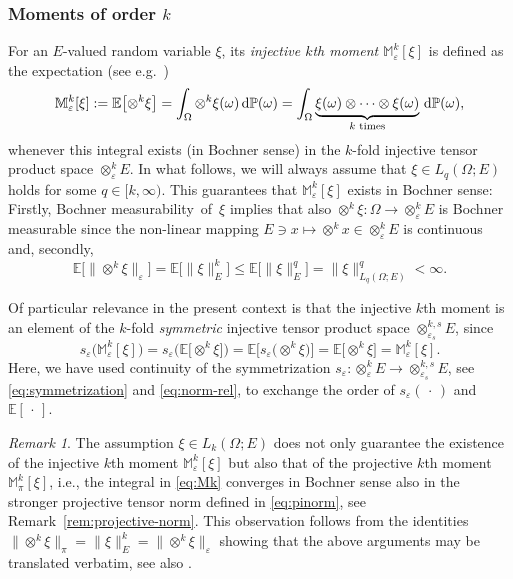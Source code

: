 \documentclass[reqno]{amsart}
\numberwithin{equation}{section}
\newcommand{\bbE}{\mathbb{E}}
\newcommand{\bbM}{\mathbb{M}}
\newcommand{\bbP}{\mathbb{P}}
\newcommand{\xk}{\otimes^k}
\newcommand{\xkeps}{\otimes^k_\varepsilon}
\newcommand{\xkseps}{\otimes^{k,s}_{\varepsilon_s}}
\newcommand{\Mk}{\bbM^k_\varepsilon}
\newcommand{\Mkpi}{\bbM^k_\pi}
\newcommand{\norm}[2]{     \| #1       \|_{ #2 }}
\newcommand{\rd}{\mathrm{d}}
\newcommand{\from}{\colon}
\newcommand{\eps}{\varepsilon}
\newcommand{\sym}{s}
\theoremstyle{remark}
\newtheorem{remark}[lemma]{Remark}
\theoremstyle{definition}
\begin{document}
\subsubsection{Moments of order $k$}

For an $E$-valued random variable $\xi$, 
its \emph{injective $k$th moment $\Mk[\xi]$} is defined as 
the expectation 
(see e.g.~\cite[Section~3.1]{JansonKaijser2015})
%
\begin{equation}\label{eq:Mk} 
\Mk[\xi] 
:= 
\bbE\bigl[ \xk \xi \bigr] 
= 
\int_{\Omega}  \xk \xi(\omega) \, \rd \bbP(\omega) 
= 
\int_\Omega 
\underbrace{\xi(\omega) \otimes \cdots \otimes \xi(\omega)}_{ 
	\text{\normalfont $k$ times}}
\, \rd\bbP(\omega), 
\end{equation} 
%
whenever this integral exists (in Bochner sense)
in the $k$-fold injective tensor product space $\xkeps E$. 
%
In what follows, we will always assume 
that $\xi \in L_q(\Omega;E)$ holds for some $q\in[k,\infty)$.  
This guarantees that $\Mk[\xi]$ exists in Bochner sense: 
Firstly, 
Bochner measurability~of~$\xi$ 
implies that also 
$\xk \xi \from \Omega \to \xkeps E$ 
is Bochner measurable 
since the non-linear 
mapping $E\ni x \mapsto \xk x \in \xkeps E$ 
is continuous and, secondly, 
%
\[
\bbE\bigl[ \norm{ {\xk} \xi }{\eps} \bigr] 
= 
\bbE \bigl[ \norm{ \xi }{E}^k \bigr] 
\leq 
\bbE \bigl[ \norm{ \xi }{E}^q \bigr] 
= 
\norm{\xi}{L_q(\Omega;E)}^q
< 
\infty. 
\]
%

Of particular relevance 
in the present context is that 
the injective $k$th moment 
is an element of the 
$k$-fold \emph{symmetric} 
injective tensor product 
space $\xkseps E$, since 
% 
\[
\sym_\eps 
\bigl( 
\Mk[\xi]
\bigr)
= 
\sym_\eps
\bigl( 
\bbE\bigl[ \xk \xi \bigr]
\bigr)
= 
\bbE\bigl[ \sym_\eps \bigl( \xk \xi \bigr) \bigr] 
= 
\bbE\bigl[ \xk \xi \bigr] 
= 
\Mk[\xi]. 
\]
% 
Here, we have used 
continuity of the symmetrization 
$\sym_\eps\from {\xkeps} E \to \xkseps E$, 
see \eqref{eq:symmetrization} and 
\eqref{eq:norm-rel}, to exchange the order 
of $\sym_\eps(\,\cdot\,)$ and $\bbE[\,\cdot\,]$. 

\begin{remark}\label{rem:pi-moment} 
	The assumption $\xi \in L_k(\Omega;E)$ 
	does not only guarantee the existence of 
	the injective $k$th moment $\Mk[\xi]$
	but also that of the 
	projective $k$th moment $\Mkpi[\xi]$, 
	i.e., the integral in \eqref{eq:Mk} 
	converges in Bochner sense 
	also in the stronger projective tensor norm 
	defined in \eqref{eq:pinorm}, 
	see Remark~\ref{rem:projective-norm}. 
	This observation follows from the identities 
	$\norm{{\xk} \xi}{\pi} 
	= 
	\norm{\xi}{E}^k
	=
	\norm{{\xk} \xi}{\eps}$ 
	showing that the above arguments 
	may be translated verbatim, 
	see also \cite[Theorem~3.8]{JansonKaijser2015}. 
\end{remark} 
\end{document}
